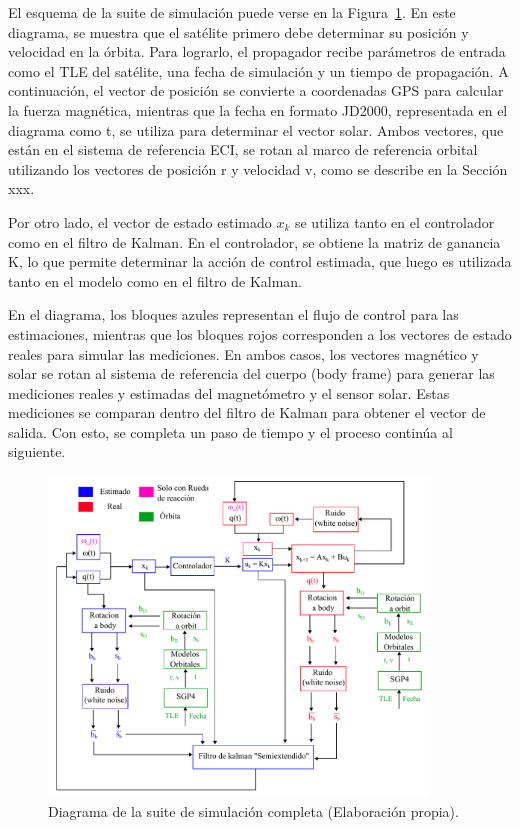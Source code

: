 El esquema de la suite de simulación puede verse en la Figura~\ref{fig:suite}. En este diagrama, se muestra que el satélite primero debe determinar su posición y velocidad en la órbita. Para lograrlo, el propagador recibe parámetros de entrada como el TLE del satélite, una fecha de simulación y un tiempo de propagación. A continuación, el vector de posición se convierte a coordenadas GPS para calcular la fuerza magnética, mientras que la fecha en formato JD2000, representada en el diagrama como t, se utiliza para determinar el vector solar. Ambos vectores, que están en el sistema de referencia ECI, se rotan al marco de referencia orbital utilizando los vectores de posición r y velocidad v, como se describe en la Sección xxx.

Por otro lado, el vector de estado estimado $x_{k}$ se utiliza tanto en el controlador como en el filtro de Kalman. En el controlador, se obtiene la matriz de ganancia K, lo que permite determinar la acción de control estimada, que luego es utilizada tanto en el modelo como en el filtro de Kalman.

En el diagrama, los bloques azules representan el flujo de control para las estimaciones, mientras que los bloques rojos corresponden a los vectores de estado reales para simular las mediciones. En ambos casos, los vectores magnético y solar se rotan al sistema de referencia del cuerpo (body frame) para generar las mediciones reales y estimadas del magnetómetro y el sensor solar. Estas mediciones se comparan dentro del filtro de Kalman para obtener el vector de salida. Con esto, se completa un paso de tiempo y el proceso continúa al siguiente.

\begin{figure}[H]
	\centering    
	\includegraphics[width=0.9\textwidth]{suite.pdf}
	\caption{Diagrama de la suite de simulación completa (Elaboración propia).}
	\label{fig:suite}
\end{figure}